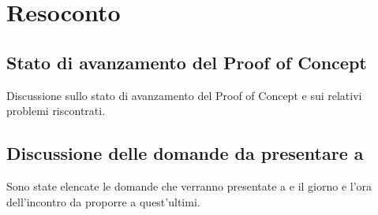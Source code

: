 \section{Resoconto}

\subsection{Stato di avanzamento del Proof of Concept}
Discussione sullo stato di avanzamento del Proof of Concept e sui relativi problemi riscontrati.


\subsection{Discussione delle domande da presentare a \Proponente}
Sono state elencate le domande che verranno presentate a \Proponente{} e il giorno e l'ora dell'incontro da proporre a quest'ultimi.